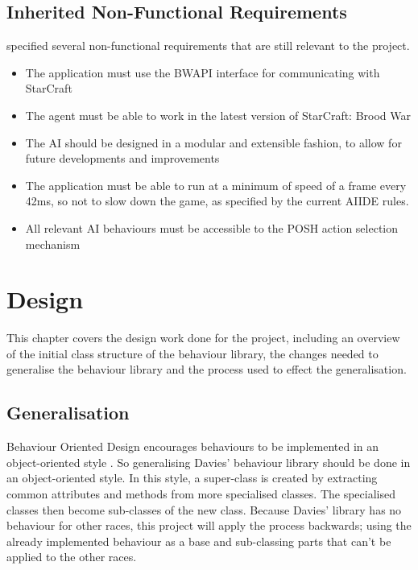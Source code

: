 \documentclass[11pt,openright,a4paper]{report}
\begin{document}
\section{Inherited Non-Functional Requirements}
 specified several non-functional requirements that are still relevant to the project.
\begin{itemize}
\item{The application must use the BWAPI interface for communicating with StarCraft}
\item{The agent must be able to work in the latest version of StarCraft: Brood War}
\item{The AI should be designed in a modular and extensible fashion, to allow for future developments and improvements}
\item{The application must be able to run at a minimum of speed of a frame every 42ms, so not to slow down the game, as specified by the current AIIDE rules.}
\item{All relevant AI behaviours must be accessible to the POSH action selection mechanism}
\end{itemize}


\chapter{Design}
\label{Design}
This chapter covers the design work done for the project, including an overview of the initial class structure of the behaviour library, the changes needed to generalise the behaviour library and the process used to effect the generalisation.

\section{Generalisation}
Behaviour Oriented Design encourages behaviours to be implemented in an object-oriented style \cite{bryson2003behavior}. So generalising Davies' behaviour library should be done in an object-oriented style. In this style, a super-class is created by extracting common attributes and methods from more specialised classes. The specialised classes then become sub-classes of the new class. Because Davies' library has no behaviour for other races, this project will apply the process backwards; using the already implemented behaviour as a base and sub-classing parts that can't be applied to the other races.
\end{document}
